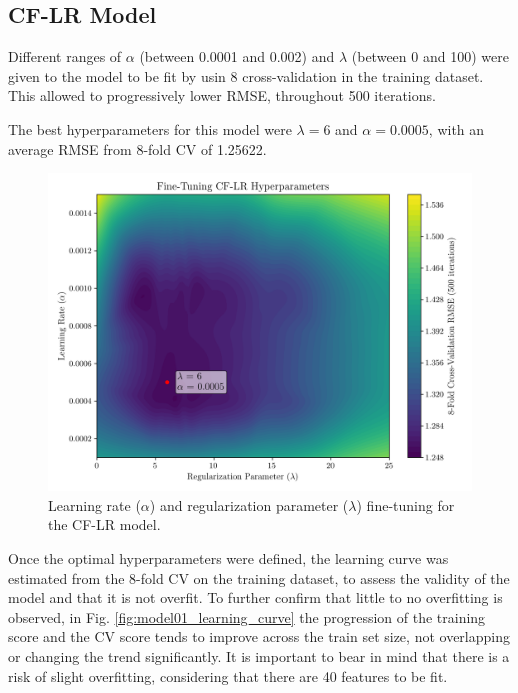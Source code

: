 \documentclass[conference]{IEEEtran}
\begin{document}
\subsection{CF-LR Model}

Different ranges of $\alpha$ (between 0.0001 and 0.002) and $\lambda$ (between 0 and 100) were given to the model to be fit by usin 8 cross-validation in the training dataset. This allowed to progressively lower RMSE, throughout 500 iterations.

The best hyperparameters for this model were $\lambda = 6$ and $\alpha = 0.0005$, with an average RMSE from 8-fold CV of 1.25622.

\begin{figure}[H]
    \centering
    \includegraphics[width=1\linewidth]{assets/model01_hyperparametres.png}
    \caption{Learning rate ($\alpha$) and regularization parameter ($\lambda$) fine-tuning for the CF-LR model.}
    \label{fig:model01_hyperparametres}
\end{figure}

Once the optimal hyperparameters were defined, the learning curve was estimated from the 8-fold CV on the training dataset, to assess the validity of the model and that it is not overfit. To further confirm that little to no overfitting is observed, in Fig. \ref{fig:model01_learning_curve} the progression of the training score and the CV score tends to improve across the train set size, not overlapping or changing the trend significantly. It is important to bear in mind that there is a risk of slight overfitting, considering that there are 40 features to be fit.
\end{document}
